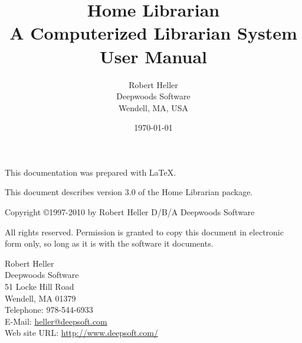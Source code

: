 \title{Home Librarian \\ A Computerized Librarian System \\ User Manual}
\author{Robert Heller \\ Deepwoods Software \\ Wendell, MA, USA}
\date{\today}
\begin{titlepage}

\maketitle


\clearpage


This documentation was prepared with \LaTeX.

This document describes version 3.0 of the Home Librarian package.

\vspace{.25in}



{\small Copyright \copyright 1997-2010 by Robert Heller D/B/A Deepwoods
Software}

\vspace{.25in}

All rights reserved.  Permission is granted to copy this document in
electronic form only, so long as it is with the software it
documents. 

\vspace{.25in}

\noindent
Robert Heller\\
Deepwoods Software\\
51 Locke Hill Road\\
Wendell, MA 01379\\
Telephone: 978-544-6933\\
E-Mail: \url{heller@deepsoft.com}\\
Web site URL: \url{http://www.deepsoft.com/}

\thispagestyle{empty}
\setcounter{page}{0}
\clearpage

\end{titlepage}

